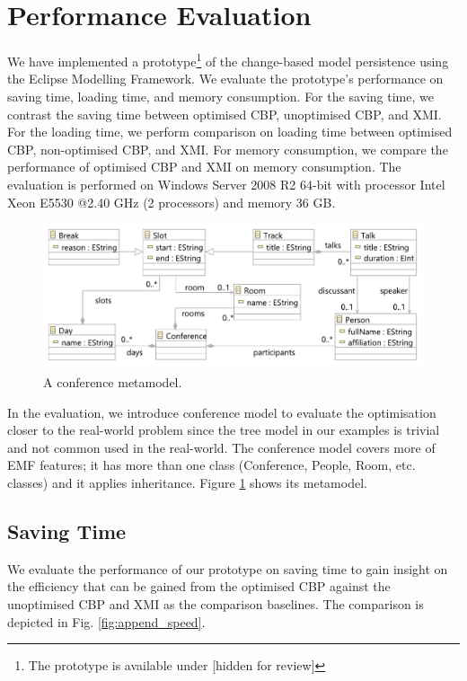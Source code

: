\documentclass{llncs}
\begin{document}
\section{Performance Evaluation}
\label{sec:performance_evaluation}
We have implemented a prototype\footnote{The prototype is available under [hidden for review] %
} of the change-based model persistence using the Eclipse Modelling Framework. We evaluate the prototype's performance on saving time, loading time, and memory consumption. For the saving time, we contrast the saving time between optimised CBP, unoptimised CBP, and XMI. For the loading time, we perform comparison on loading time between optimised CBP, non-optimised CBP, and XMI. For memory consumption, we compare the performance of optimised CBP and XMI on memory consumption. The evaluation is performed on Windows Server 2008 R2 64-bit with processor Intel Xeon E5530 @2.40 GHz (2 processors) and memory 36 GB.

\begin{figure}[htbp]
    \centering
    \includegraphics[width=0.9\linewidth]{conference_metamodel}
    \caption{A conference metamodel.}   
    \label{fig:node_metamodel}
\end{figure}

In the evaluation, we introduce conference model to evaluate the optimisation closer to the real-world problem since the tree model in our examples is trivial and not common used in the real-world. The conference model covers more of EMF features; it has more than one class (Conference, People, Room, etc. classes) and it applies inheritance. Figure \ref{fig:node_metamodel} shows its metamodel. 

\subsection{Saving Time}
\label{subsec:saving_time_test}
We evaluate the performance of our prototype on saving time to gain insight on the efficiency that can be gained from the optimised CBP against the unoptimised CBP and XMI as the comparison baselines. The comparison is depicted in Fig. \ref{fig:append_speed}.
\end{document}
